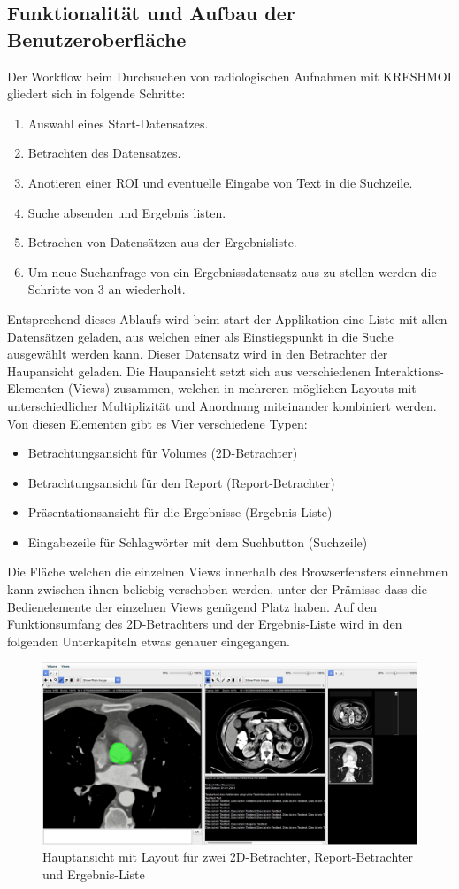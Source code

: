 \subsection{Funktionalität und Aufbau der Benutzeroberfläche}
\label{sec:Funktionalität und Aufbau der Benutzeroberfläche}
Der Workflow beim Durchsuchen von radiologischen Aufnahmen mit KRESHMOI gliedert sich in folgende Schritte:
\begin{enumerate}
	\item Auswahl eines Start-Datensatzes.
	\item Betrachten des Datensatzes.
	\item Anotieren einer ROI und eventuelle Eingabe von Text in die Suchzeile.
	\item Suche absenden und Ergebnis listen.
	\item Betrachen von Datensätzen aus der Ergebnisliste.
	\item Um neue Suchanfrage von ein Ergebnissdatensatz aus zu stellen werden die Schritte von 3 an wiederholt.
\end{enumerate}
Entsprechend dieses Ablaufs wird beim start der Applikation eine Liste mit allen Datensätzen geladen, 
aus welchen einer als Einstiegspunkt in die Suche ausgewählt werden kann.
Dieser Datensatz wird in den Betrachter der Haupansicht geladen.
Die Haupansicht setzt sich aus verschiedenen Interaktions-Elementen (Views) zusammen,
welchen in mehreren möglichen Layouts mit unterschiedlicher Multiplizität und Anordnung miteinander kombiniert werden.
Von diesen Elementen gibt es Vier verschiedene Typen:
\begin{itemize}
	\item Betrachtungsansicht für Volumes (2D-Betrachter)
	\item Betrachtungsansicht für den Report (Report-Betrachter)
	\item Präsentationsansicht für die Ergebnisse (Ergebnis-Liste)
	\item Eingabezeile für Schlagwörter mit dem Suchbutton (Suchzeile)
\end{itemize}
Die Fläche welchen die einzelnen Views innerhalb des Browserfensters einnehmen kann zwischen ihnen beliebig verschoben werden, 
unter der Prämisse dass die Bedienelemente der einzelnen Views genügend Platz haben.
Auf den Funktionsumfang des 2D-Betrachters und der Ergebnis-Liste wird in den folgenden Unterkapiteln etwas genauer eingegangen.
\begin{figure}[t]
	\centering
		\includegraphics[width=0.8\linewidth]{img/c3_application_standard.jpg}
	\caption{Hauptansicht mit Layout für zwei 2D-Betrachter, Report-Betrachter und Ergebnis-Liste}
\end{figure}


